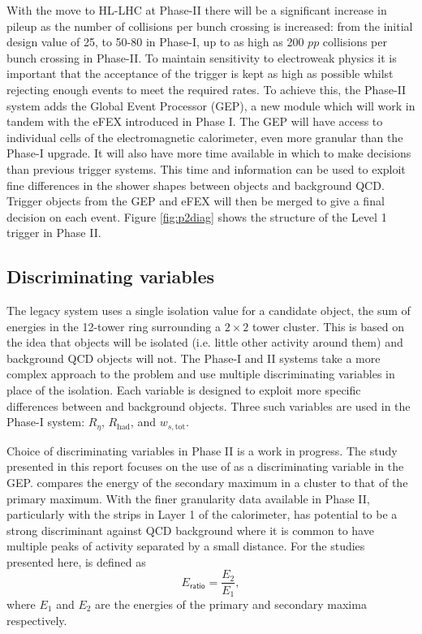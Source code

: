 With the move to HL-LHC at Phase-II there will be a significant increase in pileup as the
number of collisions per bunch crossing is increased: from the initial design value of 25,
to 50-80 in Phase-I, up to as high as 200 $pp$ collisions per bunch crossing in Phase-II.
To maintain sensitivity to
electroweak physics it is important that the acceptance of the trigger is kept as high as
possible whilst rejecting enough events to meet the required rates.
To achieve this, the Phase-II system adds the Global Event Processor (GEP), a new module
which will work in tandem with the eFEX introduced in Phase I. The GEP will have access
to individual cells of the electromagnetic calorimeter, even more granular than the
Phase-I upgrade. It will also have more time available in which to make decisions than previous
trigger systems. This time and information can be used to exploit fine differences in the shower
shapes between \egamma objects and background QCD. Trigger objects from the
GEP and eFEX will then be merged to give a final decision on each event.
Figure \ref{fig:p2diag} shows the structure of the Level 1 trigger in Phase II.

\subsection{Discriminating variables} \label{sec:trig-vars}

The legacy system uses a single isolation value for a candidate \egamma object, the sum of
energies in the 12-tower ring surrounding a $2\times2$ tower cluster. This is based on the
idea that \egamma objects will be isolated (i.e. little other activity around them) and
background QCD objects will not.
The Phase-I and II systems take a more complex approach to the problem and use multiple
discriminating variables in place of the isolation. Each variable is designed to exploit
more specific differences between \egamma and background objects. Three such variables are
used in the Phase-I system: $R_{\eta}$, $R_\mathrm{had}$, and $w_{s,\mathrm{tot}}$.

Choice of discriminating variables in Phase II is a work in progress. The study presented
in this report focuses on the use of \eratio as a discriminating variable in the GEP.
\eratio compares the energy of the secondary maximum in a cluster to that of the primary
maximum. With the finer granularity data available in Phase II, particularly with the
strips in Layer 1 of the calorimeter, \eratio has potential to be a strong discriminant
against QCD background where it is common to have multiple peaks of activity separated by
a small distance. For the studies presented here, \eratio is defined as
%
\begin{equation}
  E_\mathsf{ratio} = \frac{E_2}{E_1},
  \label{eqn:eratio}
\end{equation}
%
where $E_1$ and $E_2$ are the energies of the primary and secondary maxima respectively.
